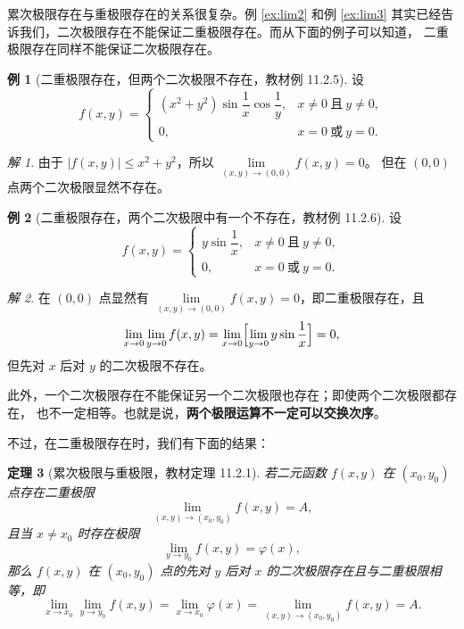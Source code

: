 \documentclass[11pt]{ctexart}
\theoremstyle{plain}
\newtheorem{thm}{定理}[section]
\theoremstyle{definition}
\newtheorem{ex}[thm]{例}
\theoremstyle{remark}
\newtheorem*{sol}{解}
\begin{document}
累次极限存在与重极限存在的关系很复杂。例 \ref{ex:lim2} 和例 \ref{ex:lim3}
其实已经告诉我们，二次极限存在不能保证二重极限存在。而从下面的例子可以知道，
二重极限存在同样不能保证二次极限存在。

\begin{ex}[二重极限存在，但两个二次极限不存在，教材例 11.2.5]\label{ex:iter1}
设
\[
  f(x,y)=
  \begin{cases}
    (x^2+y^2)\sin\dfrac{1}{x}\cos\dfrac{1}{y}, & x\neq 0\ \text{且}\ y\neq 0,\\[6pt]
    0, & x=0\ \text{或}\ y=0 .
  \end{cases}
\]
\end{ex}

\begin{sol}
由于 \(|f(x,y)|\le x^2+y^2\)，所以 \(\lim\limits_{(x,y)\to(0,0)}f(x,y)=0\)。
但在 \((0,0)\) 点两个二次极限显然不存在。
\end{sol}

\begin{ex}[二重极限存在，两个二次极限中有一个不存在，教材例 11.2.6]\label{ex:iter2}
设
\[
  f(x,y)=
  \begin{cases}
    y\sin\dfrac{1}{x}, & x\neq 0\ \text{且}\ y\neq 0,\\[6pt]
    0, & x=0\ \text{或}\ y=0 .
  \end{cases}
\]
\end{ex}

\begin{sol}
在 \((0,0)\) 点显然有 \(\lim\limits_{(x,y)\to(0,0)}f(x,y)=0\)，即二重极限存在，且
\[
  \lim_{x\to 0}\lim_{y\to 0}f(x,y)=\lim_{x\to 0}\Bigl[\lim_{y\to 0}y\sin\frac{1}{x}\Bigr]=0,
\]
但先对 \(x\) 后对 \(y\) 的二次极限不存在。
\end{sol}

此外，一个二次极限存在不能保证另一个二次极限也存在；即使两个二次极限都存在，
也不一定相等。也就是说，\textbf{两个极限运算不一定可以交换次序}。

不过，在二重极限存在时，我们有下面的结果：

\begin{thm}[累次极限与重极限，教材定理 11.2.1]\label{thm:iterated}
若二元函数 \(f(x,y)\) 在 \((x_0,y_0)\) 点存在二重极限
\[
  \lim_{(x,y)\to(x_0,y_0)}f(x,y)=A,
\]
且当 \(x\neq x_0\) 时存在极限
\[
  \lim_{y\to y_0}f(x,y)=\varphi(x),
\]
那么 \(f(x,y)\) 在 \((x_0,y_0)\) 点的先对 \(y\) 后对 \(x\) 的二次极限存在且与二重极限相等，即
\[
  \lim_{x\to x_0}\lim_{y\to y_0}f(x,y)=\lim_{x\to x_0}\varphi(x)
  =\lim_{(x,y)\to(x_0,y_0)}f(x,y)=A .
\]
\end{thm}
\end{document}
